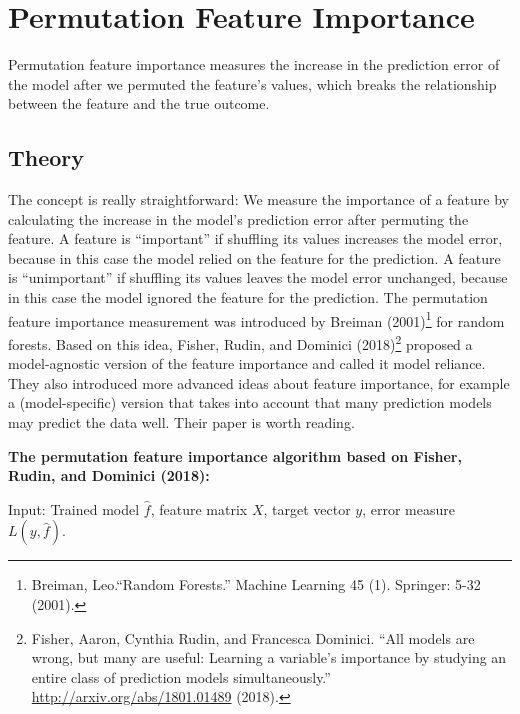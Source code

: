 \documentclass[
  11pt,
]{scrbook}
\begin{document}
\newpage

\hypertarget{feature-importance}{%
\section{Permutation Feature Importance}\label{feature-importance}}

Permutation feature importance measures the increase in the prediction error of the model after we permuted the feature's values, which breaks the relationship between the feature and the true outcome.

\hypertarget{theory-3}{%
\subsection{Theory}\label{theory-3}}

The concept is really straightforward:
We measure the importance of a feature by calculating the increase in the model's prediction error after permuting the feature.
A feature is ``important'' if shuffling its values increases the model error, because in this case the model relied on the feature for the prediction.
A feature is ``unimportant'' if shuffling its values leaves the model error unchanged, because in this case the model ignored the feature for the prediction.
The permutation feature importance measurement was introduced by Breiman (2001)\footnote{Breiman, Leo.``Random Forests.'' Machine Learning 45 (1). Springer: 5-32 (2001).} for random forests.
Based on this idea, Fisher, Rudin, and Dominici (2018)\footnote{Fisher, Aaron, Cynthia Rudin, and Francesca Dominici. ``All models are wrong, but many are useful: Learning a variable's importance by studying an entire class of prediction models simultaneously.'' \url{http://arxiv.org/abs/1801.01489} (2018).} proposed a model-agnostic version of the feature importance and called it model reliance.
They also introduced more advanced ideas about feature importance, for example a (model-specific) version that takes into account that many prediction models may predict the data well.
Their paper is worth reading.

\textbf{The permutation feature importance algorithm based on Fisher, Rudin, and Dominici (2018):}

Input: Trained model \(\hat{f}\), feature matrix \(X\), target vector \(y\), error measure \(L(y,\hat{f})\).
\end{document}
